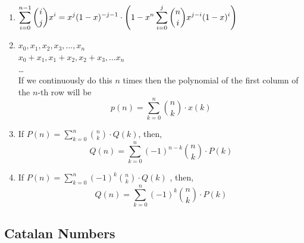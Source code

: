 \begin{enumerate}
    Here $n^{\underline{j}}=P(n,j)=\dfrac{n!}{(n-j)!}$ and $\displaystyle \left\{ \begin{matrix} k\cr j \end{matrix} \right\}$ is stirling number of the second kind.

    So, instead of $O(n)$, now you can calculate the original equation in $O(k^2)$ or even in $O(k \log^2 n)$ using NTT.
    \item $\displaystyle \displaystyle \sum \limits_{i=0}^{n-1} {i \choose j} x^i = x^j(1-x)^{-j-1} \\ \cdot \left( 1- x^n \sum \limits_{i=0}^j {n \choose i} x^{j-i} (1-x)^i \right)$
    \item $\displaystyle x_{0}, x_{1}, x_{2}, x_{3}, \dots , x_{n}$
    \\ $\displaystyle x_{0} + x_{1}, x_{1} + x_{2}, x_{2}+x_{3}, \dots x_{n}$
    \\ \dots
    \\ If we continuously do this $n$ times then the polynomial of the first column of the $n$-th row will be
    \[\displaystyle p(n)=\sum_{k=0}^{n}{n \choose k} \cdot x(k)\]
    \item If $\displaystyle P(n)=\sum_{k=0}^{n}{n \choose k} \cdot Q(k)$, then,
    \[Q(n)=\sum_{k=0}^{n}(-1)^{n-k}{n \choose k} \cdot P(k)\]
    \item If $\displaystyle P(n)=\sum_{k=0}^{n}(-1)^{k}{n \choose k} \cdot Q(k)$ , then,
    \[Q(n)=\sum_{k=0}^{n}(-1)^{k}{n \choose k} \cdot P(k)\]
\end{enumerate}

\subsection{Catalan Numbers}

